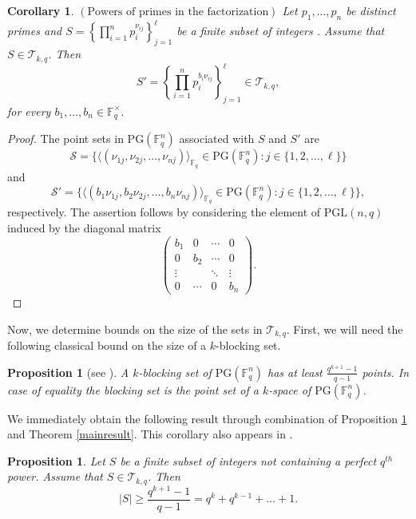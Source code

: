 \documentclass[12pt]{amsart}
\newtheorem{corollary}[theorem]{Corollary}
\newtheorem{proposition}[theorem]{Proposition}
\newcommand{\F}{{\mathbb F}}
\newcommand{\fq}{{\mathbb F}_{q}}
\newcommand{\PG}{\mathrm{PG}}
\begin{document}
\begin{corollary}
$\left( \text{Powers of primes in the factorization} \right)$  Let $p_1,\ldots,p_n$ be distinct primes and $S = \left\{\prod_{i=1}^{n} p_{i}^{\nu_{ij}}\right\}_{j=1}^{\ell}$ be a finite subset of integers . Assume that $S \in \mathcal{T}_{k,q}$. Then 
    \[S'=\left\{\prod_{i=1}^np_{i}^{b_i\nu_{ij}}\right\}_{j=1}^{\ell} \in \mathcal{T}_{k,q},\]
    for every $b_1,\ldots,b_{n} \in \F_q^{\times}$.
\end{corollary}

\begin{proof}
    The point sets in $\PG(\F_q^n)$ associated with $S$ and $S'$ are 
    \[
\mathcal{S} = \big\{ \langle ( \nu_{1j}, \nu_{2j}, \ldots, \nu_{nj} )\rangle_{\fq} \in\PG(\F_{q}^{n}) : j\in\{1, 2, \ldots, \ell\} \big\} \]
and
\[ \mathcal{S}' = \big\{\langle ( b_1\nu_{1j}, b_2\nu_{2j}, \ldots, b_n\nu_{nj} )\rangle_{\fq} \in\PG(\F_{q}^{n}) : j\in\{1, 2, \ldots, \ell\} \big\},
\]
respectively. The assertion follows by considering the element of $\mathrm{PGL}(n,q)$ induced by the diagonal matrix
\[
\begin{pmatrix}
    b_1 & 0 & \cdots & 0 \\
    0 & b_2 & \cdots & 0 \\
    \vdots &  & \ddots & \vdots \\
    0 & \cdots & 0 & b_n
\end{pmatrix}.
\]
\end{proof}


Now, we determine bounds on the size of the sets in $\mathcal{T}_{k,q}$. %
First, we will need the following classical bound on the size of a $k$-blocking set. 

\begin{proposition} [see \textnormal{\cite{bose1966characterization}}] \label{th:boundandclass}
    A $k$-blocking set of $\PG(\F_q^n)$ has at least $\frac{q^{k+1}-1}{q-1}$ points. In case of equality the blocking set is the point set of a $k$-space of $\PG(\F_q^n)$.
\end{proposition}

We immediately obtain the following result through combination of Proposition \ref{th:boundandclass} and Theorem \ref{mainresult}. This corollary also appears in \cite[Theorem 5]{skalba2004alternatives}.

\begin{proposition}
\label{lowerbound}
Let $S $ be a finite subset of integers not containing a perfect $q^{th}$ power. Assume that $S \in \mathcal{T}_{k,q}$. Then 
\[
\lvert S \rvert \geq \frac{q^{k+1}-1}{q-1} = q^{k} + q^{k-1} + \ldots + 1 .
\]
\end{proposition}
\end{document}
